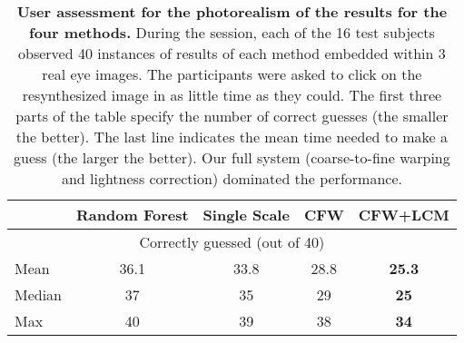 \begin{table}
\centering
\caption[User study on images of eyes]{\textbf{User assessment for the photorealism of the results for the four methods.} During the session, each of the 16 test subjects observed 40 instances of results of each method embedded within 3 real eye images. The participants were asked to click on the resynthesized image in as little time as they could. The first three parts of the table specify the number of correct guesses (the smaller the better). The last line indicates the mean time needed to make a guess (the larger the better). Our full system (coarse-to-fine warping and lightness correction) dominated the performance.}
\label{tab:user}
\begin{tabular}{|l|c|c|c|c|}
\hline
\cellcolor[HTML]{EFEFEF}               & \multicolumn{1}{l|}{\cellcolor[HTML]{EFEFEF}\textbf{Random Forest}} & \multicolumn{1}{l|}{\cellcolor[HTML]{EFEFEF}\textbf{Single Scale}} & \multicolumn{1}{l|}{\cellcolor[HTML]{EFEFEF}\textbf{CFW}} & \multicolumn{1}{l|}{\cellcolor[HTML]{EFEFEF}\textbf{CFW+LCM}} \\ \hline
\multicolumn{5}{|c|}{\cellcolor[HTML]{FDE7E5}Correctly guessed (out of 40)}                                                                                                                                                                                                                                   \\ \hline
\cellcolor[HTML]{FDE7E5}Mean           & \cellcolor[HTML]{FDE7E5}36.1                                        & \cellcolor[HTML]{FDE7E5}33.8                                       & \cellcolor[HTML]{FDE7E5}28.8                              & \cellcolor[HTML]{FDE7E5}\textbf{25.3}                         \\ \hline
\cellcolor[HTML]{FDE7E5}Median         & \cellcolor[HTML]{FDE7E5}37                                          & \cellcolor[HTML]{FDE7E5}35                                         & \cellcolor[HTML]{FDE7E5}29                                & \cellcolor[HTML]{FDE7E5}\textbf{25}                           \\ \hline
\cellcolor[HTML]{FDE7E5}Max            & \cellcolor[HTML]{FDE7E5}40                                          & \cellcolor[HTML]{FDE7E5}39                                         & \cellcolor[HTML]{FDE7E5}38                                & \cellcolor[HTML]{FDE7E5}\textbf{34}                           \\ \hline

\end{tabular}
\end{table}
